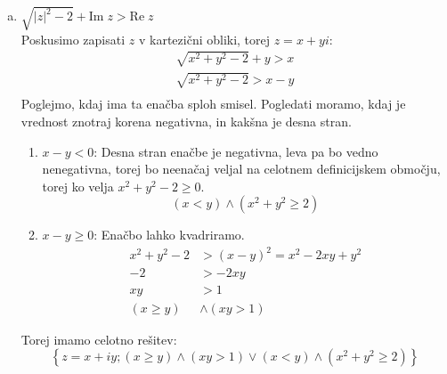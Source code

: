 \documentclass[12pt,a4paper,slovene]{article}
\begin{document}
\begin{enumerate}[(1)]
\begin{enumerate}[(a)]
        \item $\sqrt{|z|^2 - 2} + \text{Im}\;z > \text{Re}\;z$\\
        Poskusimo zapisati $z$ v kartezični obliki, torej $z = x + yi$:
        \begin{align*}
            \sqrt{x^2 + y^2 - 2} + y > x\\
            \sqrt{x^2 + y^2 - 2} > x - y\\
        \end{align*}
        Poglejmo, kdaj ima ta enačba sploh smisel. Pogledati moramo, kdaj je vrednost znotraj korena negativna, in kakšna je desna stran.
        \begin{enumerate}
            \item $x - y < 0$: Desna stran enačbe je negativna, leva pa bo vedno nenegativna, torej bo neenačaj veljal na celotnem definicijskem območju, torej ko velja $x^2 + y^2 - 2 \geq 0$.
            \[
            (x < y) \land (x^2 + y^2 \geq 2)
            \]
            \item $x - y \geq 0$: Enačbo lahko kvadriramo.
            \begin{align*}
                x^2 + y^2 - 2 &> (x - y)^2 = x^2 - 2xy +  y^2\\
                -2 &> -2xy\\
                xy &> 1\\
                (x \geq y) &\land (xy > 1)
            \end{align*}
        \end{enumerate}
        Torej imamo celotno rešitev:
        \[
        \left\{ z = x+ iy; (x \geq y) \land (xy > 1) \lor (x < y) \land (x^2 + y^2 \geq 2) \right\}
        \]
        
    \end{enumerate}

\end{enumerate}
\end{document}
